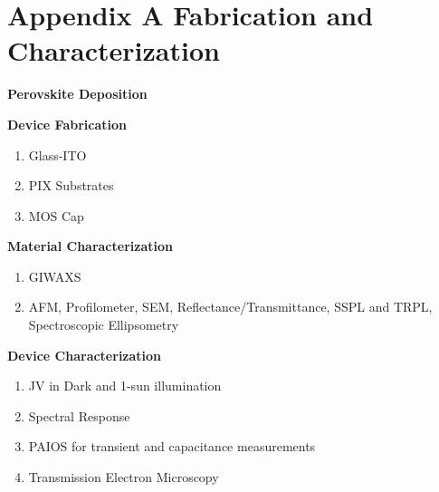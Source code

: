 \chapter{Appendix A Fabrication and Characterization}\label{ch:myappendix}


\textbf{Perovskite Deposition}

\textbf{Device Fabrication}
\begin{enumerate}
    \item Glass-ITO
    \item PIX Substrates 
    \item MOS Cap
\end{enumerate}


\textbf{Material Characterization}

\begin{enumerate}
    \item GIWAXS
    \item AFM, Profilometer, SEM, Reflectance/Transmittance, SSPL and TRPL, Spectroscopic Ellipsometry
\end{enumerate}

\textbf{Device Characterization}

\begin{enumerate}
    \item JV in Dark and 1-sun illumination
    \item Spectral Response 
    \item PAIOS for transient and capacitance measurements 
    \item Transmission Electron Microscopy 
\end{enumerate}



\cleardoublepage

